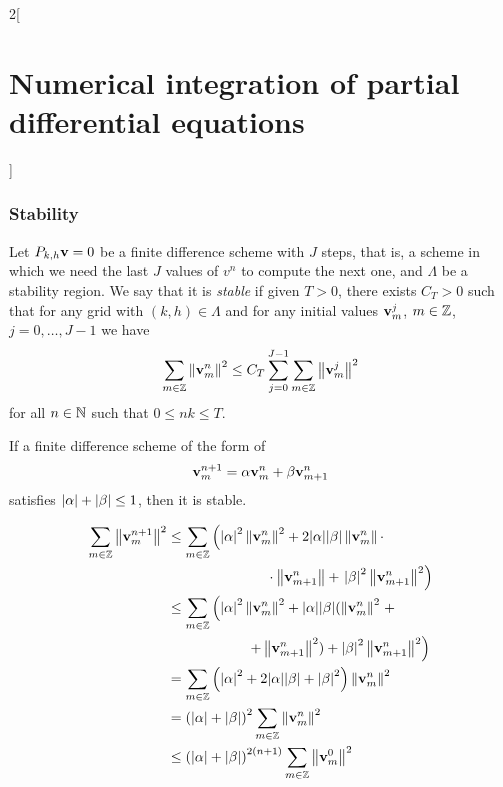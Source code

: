 \documentclass[../../../main_math.tex]{subfiles}
\begin{document}
\begin{multicols}{2}[\section{Numerical integration of partial differential equations}]
  \subsubsection{Stability}
  \begin{definition}
    Let $P_{k,h}\boldsymbol{\mathrm{v}}=0$ be a finite difference scheme with $J$ steps, that is, a scheme in which we need the last $J$ values of $v^n$ to compute the next one, and $\Lambda$ be a stability region. We say that it is \emph{stable} if given $T>0$, there exists $C_T>0$ such that for any grid with $(k,h)\in \Lambda$ and for any initial values $\boldsymbol{\mathrm{v}}_m^j$, $m\in\mathbb{Z}$, $j=0,\ldots,J-1$ we have $$\sum_{m\in\mathbb{Z}}\left\|\boldsymbol{\mathrm{v}}_m^n\right\|^2\leq C_T\sum_{j=0}^{J-1}\sum_{m\in\mathbb{Z}}\left\|\boldsymbol{\mathrm{v}}_m^j\right\|^2$$ for all $n\in\mathbb{N}$ such that $0\leq nk\leq T$.
  \end{definition}
  \begin{lemma}
    If a finite difference scheme of the form of $$\boldsymbol{\mathrm{v}}_m^{n+1}=\alpha \boldsymbol{\mathrm{v}}_m^n+\beta \boldsymbol{\mathrm{v}}_{m+1}^n$$ satisfies $\abs{\alpha}+\abs{\beta}\leq 1$, then it is stable.
  \end{lemma}
  \begin{sproof}
    \begin{align*}
      \sum_{m\in\ZZ}\norm{\vf{v}_m^{n+1}}^2 & \leq \sum_{m\in\ZZ}\left(\abs{\alpha}^2\norm{\vf{v}_m^n}^2+2\abs{\alpha}\abs{\beta}\norm{\vf{v}_m^n}\cdot\right. \\
                                            & \hspace{2.5cm}\cdot\norm{\vf{v}_{m+1}^n}+\left.\abs{\beta}^2\norm{\vf{v}_{m+1}^n}^2\right)                       \\
                                            & \leq \sum_{m\in\ZZ}\left(\abs{\alpha}^2\norm{\vf{v}_m^n}^2+\abs{\alpha}\abs{\beta}(\norm{\vf{v}_m^n}^2 \right.+  \\
                                            & \hspace{2cm}\left.+\norm{\vf{v}_{m+1}^n}^2)+\abs{\beta}^2\norm{\vf{v}_{m+1}^n}^2\right)                          \\
                                            & = \sum_{m\in\ZZ}\left(\abs{\alpha}^2+2\abs{\alpha}\abs{\beta}+\abs{\beta}^2\right)\norm{\vf{v}_{m}^n}^2          \\
                                            & ={(\abs{\alpha}+\abs{\beta})}^2 \sum_{m\in\ZZ}\norm{\vf{v}_{m}^n}^2                                              \\
                                            & \leq{(\abs{\alpha}+\abs{\beta})}^{2(n+1)} \sum_{m\in\ZZ}\norm{\vf{v}_{m}^0}^2

\end{align*}
\end{sproof}
\end{multicols}
\end{document}
